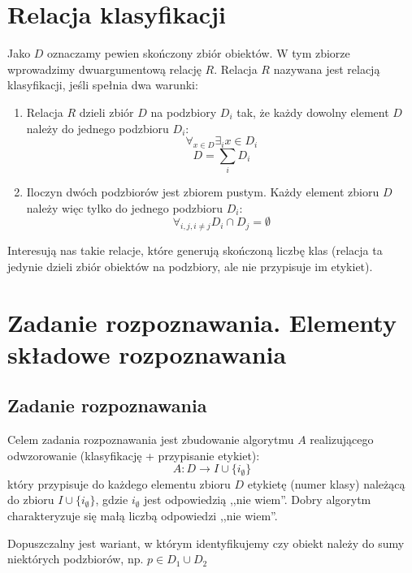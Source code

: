 \documentclass[a4paper,10pt]{article}
\begin{document}
\tableofcontents

\section{Relacja klasyfikacji}
Jako $D$ oznaczamy pewien skończony zbiór obiektów. W tym zbiorze wprowadzimy dwuargumentową relację $R$. Relacja $R$ nazywana jest relacją klasyfikacji, jeśli spełnia dwa warunki:
\begin{enumerate}
 \item Relacja $R$ dzieli zbiór $D$ na podzbiory $D_i$ tak, że każdy dowolny element $D$ należy do jednego podzbioru $D_i$:
\begin {equation}
 \displaystyle\mathop{\forall}_{x \in D} \mathop{\exists}_i x \in D_i
\end {equation}
\begin{equation}
 D = \sum_i D_i
\end{equation}
 \item Iloczyn dwóch podzbiorów jest zbiorem pustym. Każdy element zbioru $D$ należy więc tylko do jednego podzbioru $D_i$:
\begin{equation}
 \mathop{\forall}_{i, j, i \neq j} D_i \cap D_j = \emptyset
\end{equation}
\end{enumerate}

Interesują nas takie relacje, które generują skończoną liczbę klas (relacja ta jedynie dzieli zbiór obiektów na podzbiory, ale nie przypisuje im etykiet).

\section{Zadanie rozpoznawania. Elementy składowe rozpoznawania}
\subsection{Zadanie rozpoznawania}
Celem zadania rozpoznawania jest zbudowanie algorytmu $A$ realizującego odwzorowanie (klasyfikację + przypisanie etykiet):
\begin{equation}
 A : D \rightarrow I \cup \{i_{\emptyset}\}
\end{equation}
który przypisuje do każdego elementu zbioru $D$ etykietę (numer klasy) należącą do zbioru $I \cup \{i_{\emptyset}\}$, gdzie $i_{\emptyset}$ jest odpowiedzią ,,nie wiem''. Dobry algorytm charakteryzuje się małą liczbą odpowiedzi ,,nie wiem''.

Dopuszczalny jest wariant, w którym identyfikujemy czy obiekt należy do sumy niektórych podzbiorów, np. $p \in D_1 \cup D_2$
\end{document}
